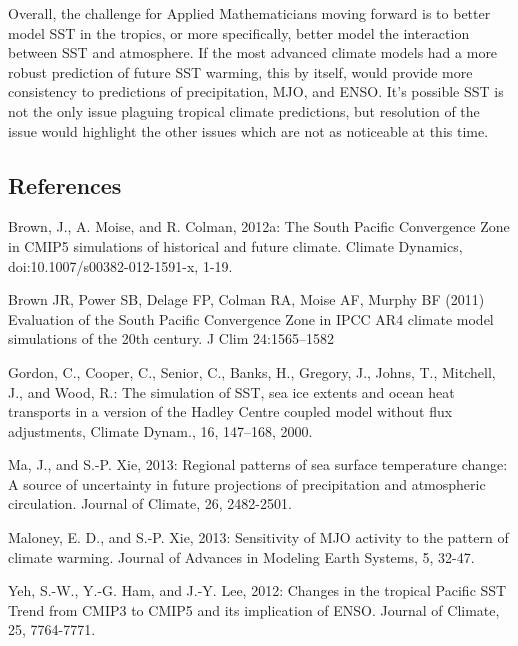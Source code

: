 Overall, the challenge for Applied Mathematicians moving forward is to better model SST in the tropics, or more specifically, better model the interaction between SST and atmosphere.  If the most advanced climate models had a more robust prediction of future SST warming, this by itself, would provide more consistency to predictions of precipitation, MJO, and ENSO.  It’s possible SST is not the only issue plaguing tropical climate predictions, but resolution of the issue would highlight the other issues which are not as noticeable at this time.\\

\subsection{References}

Brown, J., A. Moise, and R. Colman, 2012a: The South Pacific Convergence Zone in CMIP5 simulations of historical and future climate. Climate Dynamics, doi:10.1007/s00382-012-1591-x, 1-19. 

Brown JR, Power SB, Delage FP, Colman RA, Moise AF, Murphy BF
(2011) Evaluation of the South Pacific Convergence Zone in
IPCC AR4 climate model simulations of the 20th century. J Clim
24:1565–1582

Gordon, C., Cooper, C., Senior, C., Banks, H., Gregory, J., Johns,
T., Mitchell, J., and Wood, R.: The simulation of SST, sea ice extents
and ocean heat transports in a version of the Hadley Centre
coupled model without flux adjustments, Climate Dynam., 16,
147–168, 2000.

Ma, J., and S.-P. Xie, 2013: Regional patterns of sea surface temperature change: A source of uncertainty in future projections of precipitation and atmospheric circulation. Journal of Climate, 26, 2482-2501. 

Maloney, E. D., and S.-P. Xie, 2013: Sensitivity of MJO activity to the pattern of climate warming. Journal of Advances in Modeling Earth Systems, 5, 32-47. 

Yeh, S.-W., Y.-G. Ham, and J.-Y. Lee, 2012: Changes in the tropical Pacific SST Trend from CMIP3 to CMIP5 and its implication of ENSO. Journal of Climate, 25, 7764-7771. 
